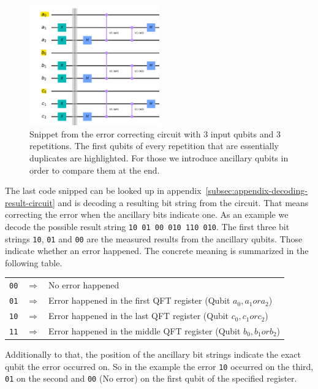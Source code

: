 \begin{figure}[H]
    \centering
    \includegraphics[width=0.5\textwidth]{res/highlighted-qubits.png}
    \caption{Snippet from the error correcting circuit with 3 input qubits and 3 repetitions. The first qubits of every repetition that are essentially duplicates are highlighted. For those we introduce ancillary qubits in order to compare them at the end.}
    \label{fig:ancillary-qubit-count}
\end{figure}

The last code snipped can be looked up in appendix~\ref{subsec:appendix-decoding-result-circuit} and is decoding a resulting bit string from the circuit.
That means correcting the error when the ancillary bits indicate one.
As an example we decode the possible result string \texttt{10 01 00 010 110 010}.
The first three bit strings \texttt{10}, \texttt{01} and \texttt{00} are the measured results from the ancillary qubits.
Those indicate whether an error happened.
The concrete meaning is summarized in the following table.

\begin{center}
    \begin{tabular}{ r c l }
        \texttt{00} & \(\Rightarrow\) & No error happened \\
        \texttt{01} & \(\Rightarrow\) & Error happened in the first QFT register (Qubit \(a_0, a_1 or a_2\)) \\
        \texttt{10} & \(\Rightarrow\) & Error happened in the last QFT register (Qubit \(c_0, c_1 or c_2\)) \\
        \texttt{11} & \(\Rightarrow\) & Error happened in the middle QFT register (Qubit \(b_0, b_1 or b_2\))
    \end{tabular}
\end{center}

Additionally to that, the position of the ancillary bit strings indicate the exact qubit the error occurred on.
So in the example the error \texttt{10} occurred on the third, \texttt{01} on the second and \texttt{00} (No error) on the first qubit of the specified register.

